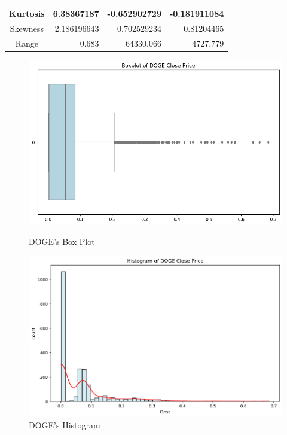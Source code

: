 \documentclass{ieeeojies}
\begin{document}
\begin{table}[H]
\begin{tabular}{|c|R|R|R|}
        \hline
        Kurtosis                        & 6.38367187                         & -0.652902729                      & -0.181911084                      \\
        \hline
        Skewness                        & 2.186196643                        & 0.702529234                       & 0.81204465                        \\
        \hline
        Range                           & 0.683                              & 64330.066                         & 4727.779                          \\
        \hline
    \end{tabular}
\end{table}

\begin{figure}[H]
    \centering
    \begin{minipage}{0.23\textwidth}
        \centering
        \includegraphics[width=\linewidth]{graph/doge_boxplot.png}
        \caption{DOGE's Box Plot}
        \label{fig:1}
    \end{minipage}
    \hfill
    \begin{minipage}{0.23\textwidth}
        \centering
        \includegraphics[width=\linewidth]{graph/doge_his.png}
        \caption{DOGE's Histogram}
        \label{fig:2}
    \end{minipage}
\end{figure}
\end{document}

